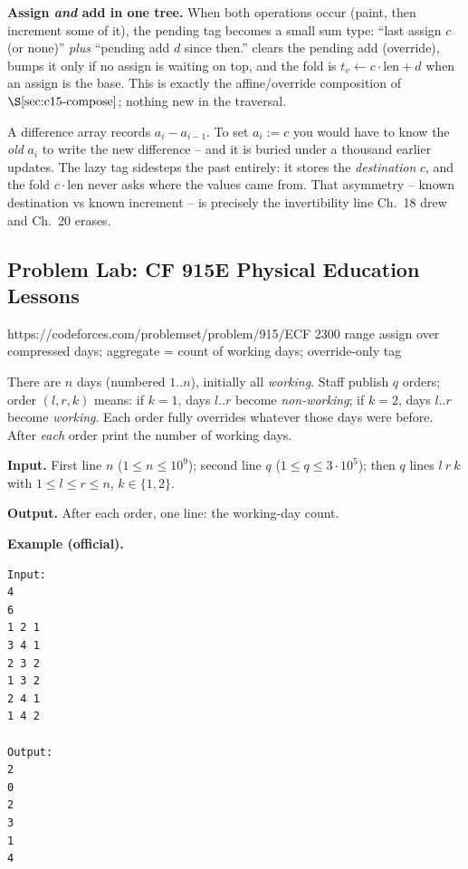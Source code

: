 \noindent\textbf{Assign \emph{and} add in one tree.}  When both operations occur (paint, then increment some of it), the pending tag becomes a small sum type: ``last assign \(c\) (or none)'' \emph{plus} ``pending add \(d\) since then.''   clears the pending add (override),  bumps it only if no assign is waiting on top, and the fold is \(t_v \leftarrow c\cdot\text{len}+d\) when an assign is the base.  This is exactly the affine/override composition of \(\secref{c15-compose}\); nothing new in the traversal.

\begin{insightbox}
A difference array records \(a_i-a_{i-1}\).  To set \(a_i:=c\) you would have to know the \emph{old} \(a_i\) to write the new difference -- and it is buried under a thousand earlier updates.  The lazy tag sidesteps the past entirely: it stores the \emph{destination} \(c\), and the fold \(c\cdot\text{len}\) never asks where the values came from.  That asymmetry -- known destination vs known increment -- is precisely the invertibility line Ch.~18 drew and Ch.~20 erases.
\end{insightbox}

\subsection{Problem Lab: CF 915E Physical Education Lessons}

  {https://codeforces.com/problemset/problem/915/E}{CF 2300}
  {range assign over compressed days; aggregate = count of working days; override-only tag}

\begin{problemstatement}
There are \(n\) days (numbered \(1..n\)), initially all \emph{working}.  Staff publish \(q\) orders; order \((l,r,k)\) means: if \(k=1\), days \(l..r\) become \emph{non-working}; if \(k=2\), days \(l..r\) become \emph{working}.  Each order fully overrides whatever those days were before.  After \emph{each} order print the number of working days.

\textbf{Input.} First line \(n\) (\(1\le n\le 10^{9}\)); second line \(q\) (\(1\le q\le 3\cdot10^{5}\)); then \(q\) lines \(l\ r\ k\) with \(1\le l\le r\le n\), \(k\in\{1,2\}\).

\textbf{Output.} After each order, one line: the working-day count.

\textbf{Example (official).}
\begin{verbatim}
Input:
4
6
1 2 1
3 4 1
2 3 2
1 3 2
2 4 1
1 4 2

Output:
2
0
2
3
1
4
\end{verbatim}
\end{problemstatement}

